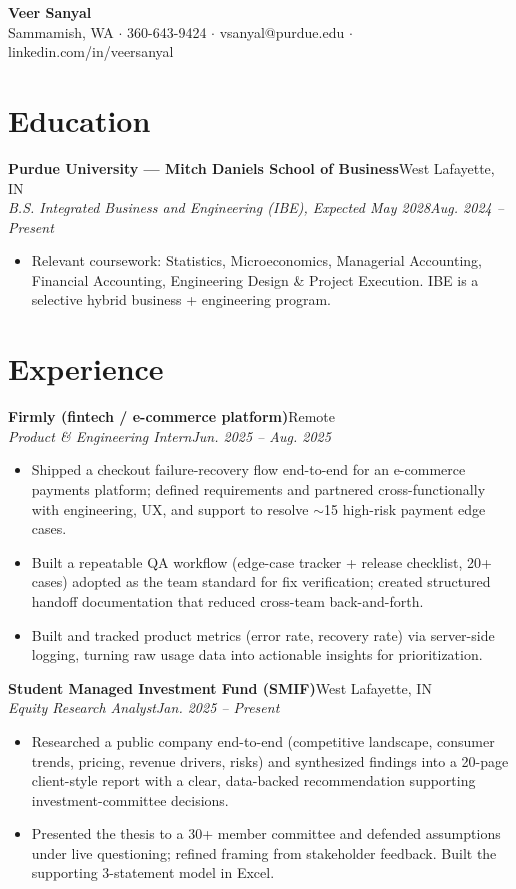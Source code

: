 \documentclass[10pt,letterpaper]{article}
\newcommand{\entry}[4]{%
  \textbf{#1}\hfill #2\\[1pt]
  \textit{#3}\hfill \textit{#4}\\[2pt]
}
\begin{document}
\begin{center}
  {\LARGE \textbf{Veer Sanyal}}\\[3pt]
  Sammamish, WA $\cdot$ 360-643-9424 $\cdot$ vsanyal@purdue.edu $\cdot$ linkedin.com/in/veersanyal
\end{center}

\section*{Education}
\textbf{Purdue University --- Mitch Daniels School of Business}\hfill West Lafayette, IN\\[1pt]
\textit{B.S. Integrated Business and Engineering (IBE), Expected May 2028}\hfill \textit{Aug. 2024 -- Present}
\begin{itemize}
  \item Relevant coursework: Statistics, Microeconomics, Managerial Accounting, Financial Accounting, Engineering Design \& Project Execution. IBE is a selective hybrid business + engineering program.
\end{itemize}

\section*{Experience}
\entry{Firmly (fintech / e-commerce platform)}{Remote}{Product \& Engineering Intern}{Jun. 2025 -- Aug. 2025}
\begin{itemize}
  \item Shipped a checkout failure-recovery flow end-to-end for an e-commerce payments platform; defined requirements and partnered cross-functionally with engineering, UX, and support to resolve $\sim$15 high-risk payment edge cases.
  \item Built a repeatable QA workflow (edge-case tracker + release checklist, 20+ cases) adopted as the team standard for fix verification; created structured handoff documentation that reduced cross-team back-and-forth.
  \item Built and tracked product metrics (error rate, recovery rate) via server-side logging, turning raw usage data into actionable insights for prioritization.
\end{itemize}

\entry{Student Managed Investment Fund (SMIF)}{West Lafayette, IN}{Equity Research Analyst}{Jan. 2025 -- Present}
\begin{itemize}
  \item Researched a public company end-to-end (competitive landscape, consumer trends, pricing, revenue drivers, risks) and synthesized findings into a 20-page client-style report with a clear, data-backed recommendation supporting investment-committee decisions.
  \item Presented the thesis to a 30+ member committee and defended assumptions under live questioning; refined framing from stakeholder feedback. Built the supporting 3-statement model in Excel.
\end{itemize}
\end{document}
